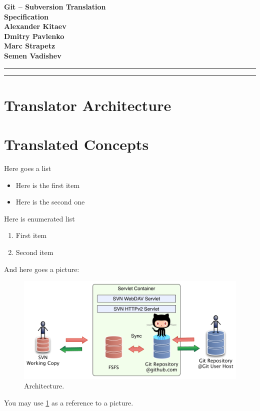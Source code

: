 \documentclass[aps,%
12pt,%
final,%
oneside,
onecolumn,%
superscriptaddress,%
centertags]{article} %
\begin{document}
\begin{titlepage}
\begin{center}

\textbf{\LARGE Git – Subversion Translation} \\[1.0cm]
\textbf{\LARGE Specification} \\[3.0cm]

\textbf{Alexander Kitaev} \\[0.7cm]
\textbf{Dmitry Pavlenko} \\[0.7cm]
\textbf{Marc Strapetz} \\[0.7cm]
\textbf{Semen Vadishev} \\[0.7cm]

\end{center}
\end{titlepage}

\topmargin=-10pt
\setcounter{page}{2}

\newpage
\hrule
\tableofcontents

\newpage
\hrule
\section{Translator Architecture}





\section{Translated Concepts}







\newpage
Here goes a list\newline %
\begin{itemize}
	\item Here is the first item
	\item Here is the second one
\end{itemize}

Here is enumerated list\\ %
\begin{enumerate}
	\item First item
	\item Second item
\end{enumerate}

And here goes a picture:

\begin{figure}[!h]
\label{arch}
\centering
\includegraphics[width=\linewidth]{img/servlet/components_not_that_safe.pdf}
\caption{Architecture.}
\end{figure}

You may use \ref{arch} as a reference to a picture.
\end{document}
